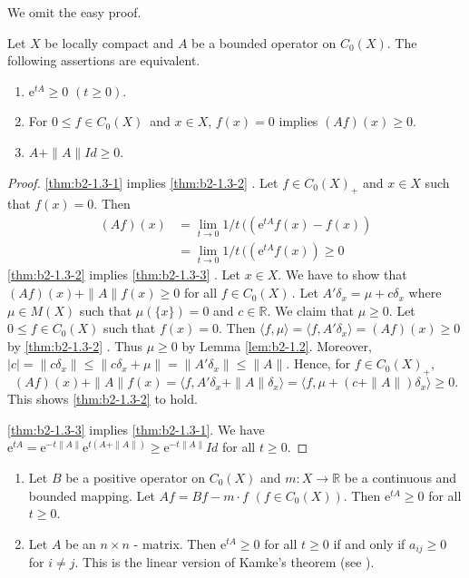 We omit the easy proof.
\begin{theorem}\label{thm:b2-1.3}
Let $X$ be locally compact and $A$ be a bounded operator on $C_{0}(X)$.
The following assertions are equivalent.
\begin{enumerate}[\upshape (a)]
\item \label{thm:b2-1.3-1}
$\mathrm{e}^{tA} \geq 0$ $(t \geq 0)$.
\item \label{thm:b2-1.3-2}
For  $0 \leq f \in C_{0}(X)$\, and  $x \in X$,  $f(x) = 0$ implies $(Af)(x) \geq 0$.
\item \label{thm:b2-1.3-3}
$A + \|A\|Id \geq 0$.
\end{enumerate}
\end{theorem}
\begin{proof}
\ref{thm:b2-1.3-1} implies \ref{thm:b2-1.3-2} .
Let $f \in C_{0}(X)_{+}$ and $x \in X$ such that $f(x) = 0$.
Then
\begin{align*}
(Af)(x) &= \lim_{t \to 0} 1/t\, ((\mathrm{e}^{tA}f(x) - f(x)) \\
&= \lim_{t \to 0} 1/t\, ((\mathrm{e}^{tA}f(x)) \geq 0
\end{align*}
\ref{thm:b2-1.3-2} implies \ref{thm:b2-1.3-3} .
Let $x \in X$.
We have to show that $(Af)(x) + \|A\|f(x) \geq 0$ for all $f \in C_{0}(X)$\,.
Let $A'\delta_{x} = \mu + c\delta_{x}$ where $\mu \in M(X)$ such that $\mu(\{x\}) = 0$ and $c \in \mathbb{R}$.
We claim that $\mu \geq 0$.
Let $0 \leq f \in C_{0}(X)$ such that $f(x) = 0$.
Then $\langle f,\mu \rangle = \langle f,A'\delta_{x} \rangle = (Af)(x) \geq 0$ by \ref{thm:b2-1.3-2} .
Thus $\mu \geq 0$ by Lemma \ref{lem:b2-1.2}.
Moreover, $|c| = \|c\delta_{x}\| \leq \|c\delta_{x} + \mu\| = \|A'\delta_{x}\| \leq \|A\|$.
Hence, for $f \in C_{0}(X)_{+}$,
\[
(Af)(x) + \|A\|f(x) = \langle f, A'\delta_{x} + \|A\|\delta_{x} \rangle = \langle f, \mu + (c+\|A\|)\delta_{x} \rangle \geq 0.
\]
This shows  \ref{thm:b2-1.3-2} to hold.

\ref{thm:b2-1.3-3} implies \ref{thm:b2-1.3-1}.
We have 
$\mathrm{e}^{tA} = \mathrm{e}^{-t\|A\|}\mathrm{e}^{t(A+\|A\|)} \geq \mathrm{e}^{-t\|A\|}Id$ for all $t \geq 0$.
\end{proof}

\begin{example}\label{ex:b2-1.4} 
 
	\begin{enumerate}[\upshape (i), wide, labelindent=.5ex] 
		\item \label{ex:b2-1.4-1}
		Let $B$ be a positive operator on $C_{0}(X)$ and $m \colon X \to \mathbb{R}$ be a continuous and bounded mapping.
		Let $Af = Bf - m \cdot f$ $(f \in C_{0}(X))$.
		Then $\mathrm{e}^{tA} \geq 0$ for all $t \geq 0$.
		
		\item \label{ex:b2-1.4-2}
		Let $A$ be an $n \times n$ - matrix.
		Then $\mathrm{e}^{tA} \geq 0$ for all $t \geq 0$ if and only if $a_{ij} \geq 0$ for $i \neq j$.
		This is the linear version of Kamke's theorem (see \citet{kamke:1932}).
    \end{enumerate}
\end{example}

